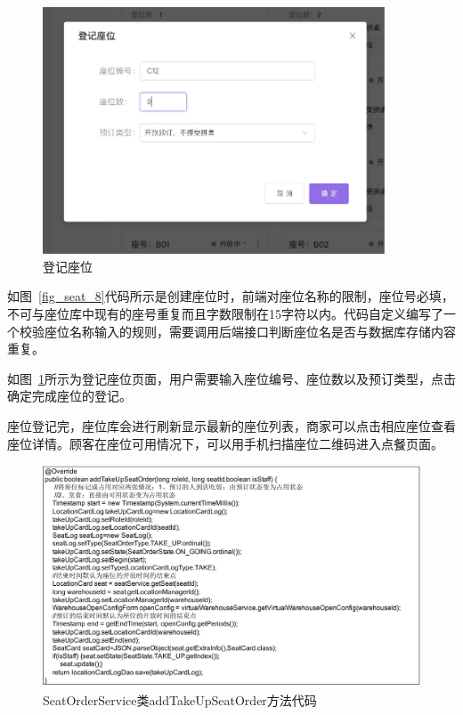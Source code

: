\begin{figure}[htbp!]
    \centering
    \includegraphics[width=4in]{FIGs/chapter4/seat_add.pdf}
    \caption{登记座位}\label{fig_seat_add}
\end{figure}

如图~\ref{fig_seat_8}代码所示是创建座位时，前端对座位名称的限制，座位号必填，不可与座位库中现有的座号重复而且字数限制在15字符以内。代码自定义编写了一个校验座位名称输入的规则，需要调用后端接口判断座位名是否与数据库存储内容重复。

如图~\ref{fig_seat_add}所示为登记座位页面，用户需要输入座位编号、座位数以及预订类型，点击确定完成座位的登记。

座位登记完，座位库会进行刷新显示最新的座位列表，商家可以点击相应座位查看座位详情。顾客在座位可用情况下，可以用手机扫描座位二维码进入点餐页面。

\begin{figure}[htbp!]
    \centering
    \includegraphics[width=\linewidth]{FIGs/chapter4/9.pdf}
    \caption{SeatOrderService类addTakeUpSeatOrder方法代码}\label{fig_seat_9}
\end{figure}

